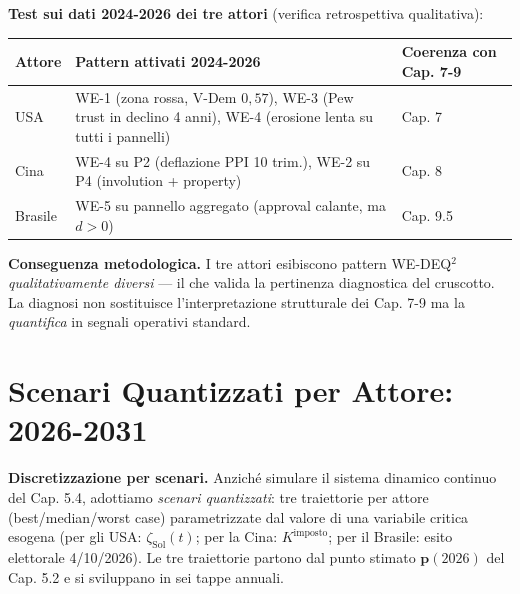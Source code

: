 \Proved{} \textbf{Test sui dati 2024-2026 dei tre attori} (verifica
retrospettiva qualitativa):

{\def\LTcaptype{none} %
{\small\begin{longtable}[]{@{}
  >{\raggedright\arraybackslash}p{}
  >{\raggedright\arraybackslash}p{}
  >{\raggedright\arraybackslash}p{}@{}}
\toprule\noalign{}
\begin{minipage}[b]{\linewidth}\raggedright
Attore
\end{minipage} & \begin{minipage}[b]{\linewidth}\raggedright
Pattern attivati 2024-2026
\end{minipage} & \begin{minipage}[b]{\linewidth}\raggedright
Coerenza con Cap. 7-9
\end{minipage} \\
\midrule\noalign{}
\endhead
\bottomrule\noalign{}
\endlastfoot
USA & WE-1 (zona rossa, V-Dem \(0{,}57\)), WE-3 (Pew trust in declino 4
anni), WE-4 (erosione lenta su tutti i pannelli) & \Proved{} Cap. 7 \\
Cina & WE-4 su P2 (deflazione PPI 10 trim.), WE-2 su P4 (involution +
property) & \Proved{} Cap. 8 \\
Brasile & WE-5 su pannello aggregato (approval calante, ma \(d > 0\)) &
\Proved{} Cap. 9.5 \\
\end{longtable}}
}

\Hypoth{} \textbf{Conseguenza metodologica.} I tre attori esibiscono
pattern WE-DEQ$^2$ \emph{qualitativamente diversi} --- il che valida la
pertinenza diagnostica del cruscotto. La diagnosi non sostituisce
l'interpretazione strutturale dei Cap. 7-9 ma la \emph{quantifica} in
segnali operativi standard.



\section{Scenari Quantizzati per Attore:
2026-2031}\label{scenari-quantizzati-per-attore-2026-2031}

\Hypoth{} \textbf{Discretizzazione per scenari.} Anziché simulare il
sistema dinamico continuo del Cap. 5.4, adottiamo \emph{scenari
quantizzati}: tre traiettorie per attore (best/median/worst case)
parametrizzate dal valore di una variabile critica esogena (per gli USA:
\(\zeta_{\text{Sol}}(t)\); per la Cina: \(K^{\text{imposto}}\); per il
Brasile: esito elettorale 4/10/2026). Le tre traiettorie partono dal
punto stimato \(\boldsymbol{p}(2026)\) del Cap. 5.2 e si sviluppano in
sei tappe annuali.


